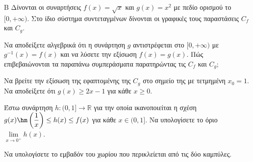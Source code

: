 \begin{thema}{Β}
Δίνονται οι συναρτήσεις $f(x) = \sqrt{x}$ και $g(x) = x^2$ με πεδίο ορισμού το $[0, +\infty)$. Στο ίδιο σύστημα συντεταγμένων δίνονται οι γραφικές τους παραστάσεις $C_f$ και $C_g$.
\begin{center}
\end{center}
\begin{erwthma}
  \item Να αποδείξετε αλγεβρικά ότι η συνάρτηση $g$ αντιστρέφεται στο $[0, +\infty)$ με $g^{-1}(x) = f(x)$ και να λύσετε την εξίσωση $f(x) = g(x)$. Πώς επιβεβαιώνονται τα παραπάνω συμπεράσματα παρατηρώντας τις $C_f$ και $C_g$;
  \item Να βρείτε την εξίσωση της εφαπτομένης της $C_g$ στο σημείο της με τετμημένη $x_0=1$. Να αποδείξετε ότι $g(x) \ge 2x - 1$ για κάθε $x \ge 0$.
  \item Έστω συνάρτηση $h: (0, 1] \to \mathbb{R}$ για την οποία ικανοποιείται η σχέση $g(x) \hm\left(\dfrac{1}{x}\right) \le h(x) \le f(x)$ για κάθε $x \in (0, 1]$. Να υπολογίσετε το όριο $\lim\limits_{x \to 0^+} h(x)$.
  \item Να υπολογίσετε το εμβαδόν του χωρίου που περικλείεται από τις δύο καμπύλες.
\end{erwthma}
\end{thema}

